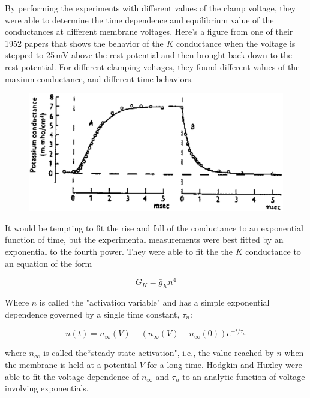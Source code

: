 \documentclass[12pt]{article}
\begin{document}
By performing the experiments with different values of the clamp voltage, they were able to determine the time dependence and equilibrium value of the conductances at different membrane voltages. Here's a figure from one of their 1952 papers that shows the behavior of the $K$ conductance when the voltage is stepped to 25\,mV above the rest potential and then brought back down to the rest potential. For different clamping voltages, they found different values of the maxium conductance, and different time behaviors.

\begin{figure}[h]
  \centering
 \includegraphics[scale=0.5]{figures/vcdata.eps}
  \label{fig:vcdata}
\end{figure}

It would be tempting to fit the rise and fall of the conductance to an exponential function of time, but the experimental measurements were best fitted by an exponential to the fourth power. They were able to fit the the $K$ conductance to an equation of the form

\begin{equation}
		G_K = \bar{g}_Kn^4
\label{eq:eq2}		
\end{equation}

Where $n$ is called the "activation variable" and has a simple exponential dependence governed by a single time constant, $\tau_n$:

\begin{equation}
		n(t) = n_\infty(V)-(n_\infty(V)-n_\infty(0))e^{-t/\tau_n}
\label{eq:eq3}		
\end{equation}

where $n_\infty$ is called the``steady state activation", i.e., the value reached by $n$ when the membrane is held at a potential $V$ for a long time. Hodgkin and Huxley were able to fit the voltage dependence of $n_\infty$ and $\tau_n$ to an analytic function of voltage involving exponentials.
\end{document}
